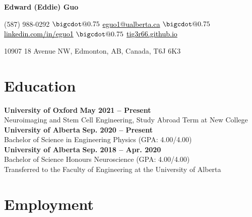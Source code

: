 \documentclass{article}
\makeatletter
\newcommand*\bigcdot{\mathpalette\bigcdot@{0.75}}
\newcommand*\bigcdot@[2]{\mathbin{\vcenter{\hbox{\scalebox{#2}{$\m@th#1\bullet$}}}}}
\makeatother
\begin{document}
\thispagestyle{plain}
\LARGE \textbf{\textcolor{my_colour}{Edward (Eddie) Guo}} \vspace{.25em}

\normalfont \normalsize
(587) 988-0292
    \hspace{.25em} $\bigcdot$ \hspace{.25em}
\href{mailto:eguo1@ualberta.ca}{\textcolor{black}{eguo1@ualberta.ca}}
    \hspace{.25em} $\bigcdot$ \hspace{.25em}
\href{https://www.linkedin.com/in/eguo1}{\textcolor{black}{linkedin.com/in/eguo1}}
    \hspace{.25em} $\bigcdot$ \hspace{.25em}
\href{https://tig3r66.github.io/index.html}{\textcolor{black}{tig3r66.github.io}}

10907 18 Avenue NW, Edmonton, AB, Canada, T6J 6K3
\vspace{-.25em}


\section*{\textcolor{my_colour}{Education}}
\vspace{-.25em} \hrulefill \vspace{.75em}

\textbf{University of Oxford} \hfill \textbf{May 2021 -- Present}\\
Neuroimaging and Stem Cell Engineering, Study Abroad Term at New College \\

\textbf{University of Alberta} \hfill \textbf{Sep. 2020 -- Present}\\
Bachelor of Science in Engineering Physics (GPA: 4.00/4.00) \\

\textbf{University of Alberta} \hfill \textbf{Sep. 2018 -- Apr. 2020} \\
Bachelor of Science Honours Neuroscience (GPA: 4.00/4.00) \\
Transferred to the Faculty of Engineering at the University of Alberta


\section*{\textcolor{my_colour}{Employment}}
\vspace{-.25em} \hrulefill \vspace{.75em}
\end{document}
